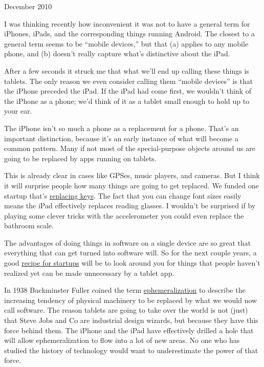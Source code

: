 December 2010

I was thinking recently how inconvenient it was not to have a general
term for iPhones, iPads, and the corresponding things running Android.
The closest to a general term seems to be ``mobile devices,'' but that
(a) applies to any mobile phone, and (b) doesn't really capture what's
distinctive about the iPad.

After a few seconds it struck me that what we'll end up calling these
things is tablets. The only reason we even consider calling them
``mobile devices'' is that the iPhone preceded the iPad. If the iPad had
come first, we wouldn't think of the iPhone as a phone; we'd think of it
as a tablet small enough to hold up to your ear.

The iPhone isn't so much a phone as a replacement for a phone. That's an
important distinction, because it's an early instance of what will
become a common pattern. Many if not most of the special-purpose objects
around us are going to be replaced by apps running on tablets.

This is already clear in cases like GPSes, music players, and cameras.
But I think it will surprise people how many things are going to get
replaced. We funded one startup that's
\href{http://lockitron.com/}{replacing keys}. The fact that you can
change font sizes easily means the iPad effectively replaces reading
glasses. I wouldn't be surprised if by playing some clever tricks with
the accelerometer you could even replace the bathroom scale.

The advantages of doing things in software on a single device are so
great that everything that can get turned into software will. So for the
next couple years, a good \href{http://ycombinator.com/rfs8.html}{recipe
for startups} will be to look around you for things that people haven't
realized yet can be made unnecessary by a tablet app.

In 1938 Buckminster Fuller coined the term
\href{http://en.wikipedia.org/wiki/Ephemeralization}{ephemeralization}
to describe the increasing tendency of physical machinery to be replaced
by what we would now call software. The reason tablets are going to take
over the world is not (just) that Steve Jobs and Co are industrial
design wizards, but because they have this force behind them. The iPhone
and the iPad have effectively drilled a hole that will allow
ephemeralization to flow into a lot of new areas. No one who has studied
the history of technology would want to underestimate the power of that
force.

